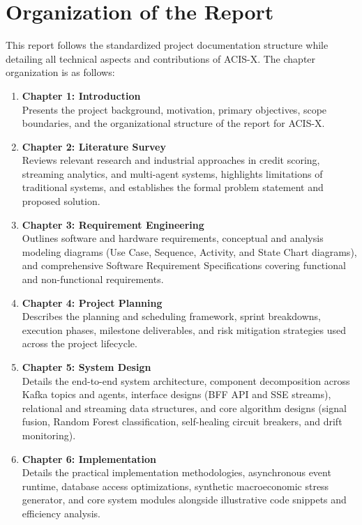 \documentclass[a4paper, 12pt]{report}
\begin{document}
\section{Organization of the Report}
This report follows the standardized project documentation structure while detailing all technical aspects and contributions of ACIS-X. The chapter organization is as follows:

\begin{enumerate}[label=\textbf{\roman*.}, itemsep=2pt]
    \item \textbf{Chapter 1: Introduction} \\
    Presents the project background, motivation, primary objectives, scope boundaries, and the organizational structure of the report for ACIS-X.
    
    \item \textbf{Chapter 2: Literature Survey} \\
    Reviews relevant research and industrial approaches in credit scoring, streaming analytics, and multi-agent systems, highlights limitations of traditional systems, and establishes the formal problem statement and proposed solution.
    
    \item \textbf{Chapter 3: Requirement Engineering} \\
    Outlines software and hardware requirements, conceptual and analysis modeling diagrams (Use Case, Sequence, Activity, and State Chart diagrams), and comprehensive Software Requirement Specifications covering functional and non-functional requirements.
    
    \item \textbf{Chapter 4: Project Planning} \\
    Describes the planning and scheduling framework, sprint breakdowns, execution phases, milestone deliverables, and risk mitigation strategies used across the project lifecycle.
    
    \item \textbf{Chapter 5: System Design} \\
    Details the end-to-end system architecture, component decomposition across Kafka topics and agents, interface designs (BFF API and SSE streams), relational and streaming data structures, and core algorithm designs (signal fusion, Random Forest classification, self-healing circuit breakers, and drift monitoring).
    
    \item \textbf{Chapter 6: Implementation} \\
    Details the practical implementation methodologies, asynchronous event runtime, database access optimizations, synthetic macroeconomic stress generator, and core system modules alongside illustrative code snippets and efficiency analysis.
    

\end{enumerate}
\end{document}
